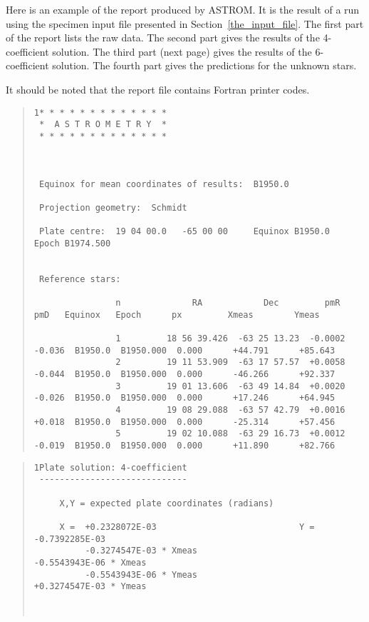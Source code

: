 \documentclass[twoside,11pt]{article}
\renewcommand{\_}{\texttt{\symbol{95}}}
\begin{document}
Here is an example of the report produced by ASTROM.  It is the result
of a run using the specimen input file presented in
Section~\ref{the_input_file}.  The first part of the report lists the
raw data.  The second part gives the results of the 4-coefficient
solution.  The third part (next page) gives the results of the
6-coefficient solution.  The fourth part gives the predictions for the
unknown stars.

It should be noted that the report file contains Fortran printer codes.

\vfill
\begin{tiny}
\begin{quote}
\begin{verbatim}
1* * * * * * * * * * * * *
 *  A S T R O M E T R Y  *
 * * * * * * * * * * * * *



 Equinox for mean coordinates of results:  B1950.0

 Projection geometry:  Schmidt

 Plate centre:  19 04 00.0   -65 00 00     Equinox B1950.0     Epoch B1974.500


 Reference stars:

                n              RA            Dec         pmR    pmD   Equinox   Epoch      px         Xmeas        Ymeas

                1         18 56 39.426  -63 25 13.23  -0.0002 -0.036  B1950.0  B1950.000  0.000      +44.791      +85.643
                2         19 11 53.909  -63 17 57.57  +0.0058 -0.044  B1950.0  B1950.000  0.000      -46.266      +92.337
                3         19 01 13.606  -63 49 14.84  +0.0020 -0.026  B1950.0  B1950.000  0.000      +17.246      +64.945
                4         19 08 29.088  -63 57 42.79  +0.0016 +0.018  B1950.0  B1950.000  0.000      -25.314      +57.456
                5         19 02 10.088  -63 29 16.73  +0.0012 -0.019  B1950.0  B1950.000  0.000      +11.890      +82.766
\end{verbatim}
\end{quote}

\vfill

\begin{quote}
\begin{verbatim}
1Plate solution: 4-coefficient
 -----------------------------

     X,Y = expected plate coordinates (radians)

     X =  +0.2328072E-03                            Y =  -0.7392285E-03
          -0.3274547E-03 * Xmeas                         -0.5543943E-06 * Xmeas
          -0.5543943E-06 * Ymeas                         +0.3274547E-03 * Ymeas



\end{verbatim}
\end{quote}
\end{tiny}
\end{document}
